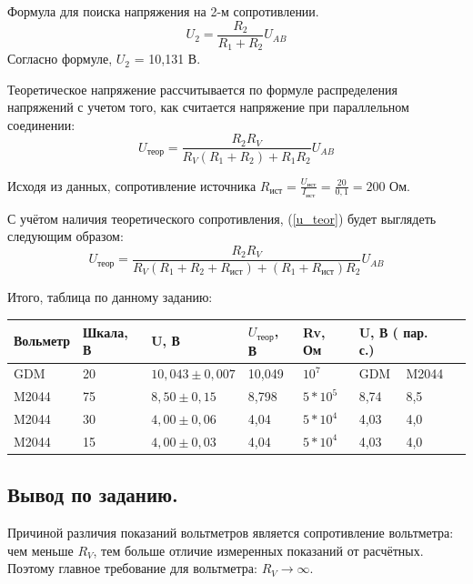 \documentclass[a4paper,12pt]{article}
\begin{document}
\newpage

Формула для поиска напряжения на 2-м сопротивлении.
\begin{equation}
    U_2 = \frac{R_2}{R_1+R_2}U_{AB}
\end{equation}
Согласно формуле, $U_2$ = 10,131 В.

Теоретическое напряжение рассчитывается по формуле распределения
напряжений с учетом того, как считается напряжение при параллельном
соединении:
\begin{equation}\label{u_teor}
    U_{теор} = \frac{R_2 R_V}{R_V(R_1+R_2)+R_1R_2}U_{AB}
\end{equation}

Исходя из данных, сопротивление источника $R_{ист} = \frac{U_{ист}}{I_{ист}} = \frac{20}{0,1} = 200$ Ом.

С учётом наличия теоретического сопротивления, (\ref{u_teor}) будет выглядеть следующим образом:
\begin{equation}\label{u_teor_ist}
    U_{теор} = \frac{R_2 R_V}{R_V(R_1+R_2+R_{ист})+(R_1+R_{ист})R_2}U_{AB}
\end{equation}

Итого, таблица по данному заданию:
\begin{table}[!ht]
    \centering
    \begin{tabular}{|l|l|l|l|l|l|l|l|}
    \hline
        Вольметр & Шкала, В & U, В & $U_{теор}$, В & Rv, Ом & \multicolumn{2}{l|}{U, В ( пар. с.)} \\ \hline
        GDM & 20 & $10,043\pm0,007$ & 10,049 & $10^7$   & GDM   & M2044 \\ \hline
        M2044 & 75 & $8,50\pm0,15$  & 8,798 & $5*10^5$ & 8,74 & 8,5 \\ \hline
        M2044 & 30 & $4,00\pm0,06$  & 4,04 & $5*10^4$ & 4,03  & 4,0 \\ \hline
        M2044 & 15 & $4,00\pm0,03$  & 4,04 & $5*10^4$ & 4,03  & 4,0 \\ \hline
    \end{tabular}
\end{table}

\subsection{Вывод по заданию.}
Причиной различия показаний вольтметров является сопротивление 
вольтметра: чем меньше $R_V$, тем больше отличие измеренных показаний от расчётных. Поэтому главное требование для вольтметра: $R_V \xrightarrow{} \infty$.
\end{document}
